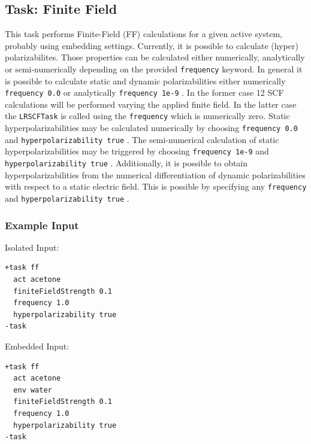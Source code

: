 \documentclass[bibliography=totocnumbered,a4paper,10pt,oneside]{scrbook}
\newcommand{\ttt}[1]{%
  \begingroup\setlength{\fboxsep}{1pt}%
  \colorbox{serenity-green!30}{\texttt{\hspace*{2pt}\vphantom{(g}#1\hspace*{2pt}}}%
  \endgroup
}
\begin{document}
\subsection{Task: Finite Field}\label{task: ff}
\label{sec:ff}
This task performs Finite-Field (FF) calculations for a given active system, probably using embedding settings. 
Currently, it is possible to calculate (hyper) polarizabilites. Those properties can be calculated
either numerically, analytically or semi-numerically depending on the provided \ttt{frequency} keyword.
In general it is possible to calculate static and dynamic polarizabilities either numerically \ttt{frequency 0.0} or analytically \ttt{frequency 1e-9}. In the former case 12 SCF calculations will be performed varying the applied finite field.
In the latter case the \ttt{LRSCFTask} is called using the \ttt{frequency} which is numerically zero.
Static hyperpolarizabilities may be calculated numerically by choosing \ttt{frequency 0.0} and \ttt{hyperpolarizability true}.
The semi-numerical calculation of static hyperpolarizabilities may be triggered by choosing \ttt{frequency 1e-9} and \ttt{hyperpolarizability true}. Additionally, it is possible to obtain hyperpolarizabilities from the numerical differentiation
of dynamic polarizabilities with respect to a static electric field. This is possible by specifying any \ttt{frequency} and \ttt{hyperpolarizability true}.
\subsubsection{Example Input}
Isolated Input:
\begin{lstlisting}
+task ff
  act acetone
  finiteFieldStrength 0.1
  frequency 1.0
  hyperpolarizability true
-task
\end{lstlisting}
Embedded Input:
\begin{lstlisting}
+task ff
  act acetone
  env water
  finiteFieldStrength 0.1
  frequency 1.0
  hyperpolarizability true
-task
\end{lstlisting}
\end{document}
